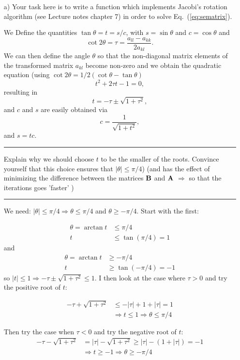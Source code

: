 \documentclass[11pt,a4wide]{article}
\begin{document}
\begin{enumerate}
\item[a)] Your task here is to write a function which implements
Jacobi's rotation algorithm (see Lecture notes chapter 7)  in order to
solve Eq.~(\ref{eq:sematrix}). 

We 
Define the quantities $\tan\theta = t= s/c$, with $s=\sin\theta$ and $c=\cos\theta$ and
\[\cot 2\theta=\tau = \frac{a_{ll}-a_{kk}}{2a_{kl}}.
\]
We can then define the angle $\theta$ so that the non-diagonal matrix elements of the transformed matrix 
$a_{kl}$ become non-zero and
we obtain the quadratic equation (using $\cot 2\theta=1/2(\cot \theta-\tan\theta)$
\[
t^2+2\tau t-1= 0,
\]
resulting in 
\[
  t = -\tau \pm \sqrt{1+\tau^2},
\]
and $c$ and $s$ are easily obtained via
\[
   c = \frac{1}{\sqrt{1+t^2}},
\]
and $s=tc$.  

\noindent\rule{\textwidth}{1pt}
Explain why we should choose 
$t$ to be the smaller of the roots. Convince yourself that this choice  ensures that $|\theta| \le \pi/4$)
 (and has the 
effect of minimizing the difference between the matrices ${\bf B}$ and ${\bf A}$ $\Rightarrow$ so that the iterations goes 'faster' )

\noindent\rule{\textwidth}{1pt}
We need: $|\theta| \leq \pi /4 \Rightarrow \theta \leq \pi/4$ and $\theta \geq -\pi/4$. Start with the first:

\begin{align*}
\theta = \arctan t &\leq \pi/4 \\
t &\leq \tan (\pi/4) = 1
\end{align*}
and 
\begin{align*}
\theta = \arctan t &\geq -\pi/4 \\
t &\geq \tan(-\pi/4) = -1
\end{align*}
so $|t| \leq 1\Rightarrow -\tau \pm \sqrt{1 + \tau^2} \leq 1$. I then look at the case where $\tau > 0$ and try the positive root of $t$:

\begin{align*}
-\tau + \sqrt{1 + \tau^2} &\leq -|\tau| + 1 + |\tau| = 1 \\
&\Rightarrow t \leq 1 \Rightarrow \theta \leq \pi/4
\end{align*}

Then try the case when $\tau < 0$ and try the negative root of $t$:
\begin{align*}
-\tau - \sqrt{1 + \tau^2} &= |\tau| - \sqrt{1 + \tau^2} \geq |\tau| - (1 + |\tau|) = -1 \\
&\Rightarrow t \geq -1 \Rightarrow \theta \geq -\pi/4
\end{align*}


\end{enumerate}
\end{document}
